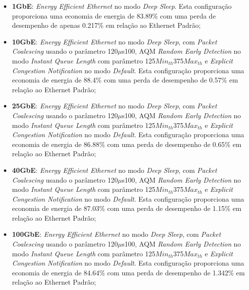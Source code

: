 \begin{itemize}

\item \textbf{1GbE}: \emph{Energy Efficient Ethernet} no modo \emph{Deep Sleep}. Esta configuração proporciona uma economia de energia de 83.89\% com uma perda de desempenho de apenas 0.217\% em relação ao Ethernet Padrão;


\item \textbf{10GbE}: \emph{Energy Efficient Ethernet} no modo \emph{Deep Sleep}, com \emph{Packet Coalescing} usando o parâmetro 120$\mu$s100, AQM \emph{Random Early Detection} no modo \emph{Instant Queue Length} com parâmetro 125{$\mathit{Min}_\mathit{th}$}375{$\mathit{Max}_\mathit{th}$} e \emph{Explicit Congestion Notification} no modo \emph{Default}. Esta configuração proporciona uma economia de energia de 88.4\% com uma perda de desempenho de 0.57\% em relação ao Ethernet Padrão;


\item \textbf{25GbE}: \emph{Energy Efficient Ethernet} no modo \emph{Deep Sleep}, com \emph{Packet Coalescing} usando o parâmetro 120$\mu$s100, AQM \emph{Random Early Detection} no modo \emph{Instant Queue Length} com parâmetro 125{$\mathit{Min}_\mathit{th}$}375{$\mathit{Max}_\mathit{th}$} e \emph{Explicit Congestion Notification} no modo \emph{Default}. Esta configuração proporciona uma economia de energia de 86.88\% com uma perda de desempenho de 0.65\% em relação ao Ethernet Padrão;


\item \textbf{40GbE}: \emph{Energy Efficient Ethernet} no modo \emph{Deep Sleep}, com \emph{Packet Coalescing} usando o parâmetro 120$\mu$s100, AQM \emph{Random Early Detection} no modo \emph{Instant Queue Length} com parâmetro 125{$\mathit{Min}_\mathit{th}$}375{$\mathit{Max}_\mathit{th}$} e \emph{Explicit Congestion Notification} no modo \emph{Default}. Esta configuração proporciona uma economia de energia de 87.03\% com uma perda de desempenho de 1.15\% em relação ao Ethernet Padrão;



\item \textbf{100GbE}: \emph{Energy Efficient Ethernet} no modo \emph{Deep Sleep}, com \emph{Packet Coalescing} usando o parâmetro 120$\mu$s100, AQM \emph{Random Early Detection} no modo \emph{Instant Queue Length} com parâmetro 125{$\mathit{Min}_\mathit{th}$}375{$\mathit{Max}_\mathit{th}$} e \emph{Explicit Congestion Notification} no modo \emph{Default}. Esta configuração proporciona uma economia de energia de 84.64\% com uma perda de desempenho de 1.342\% em relação ao Ethernet Padrão;




\end{itemize}

